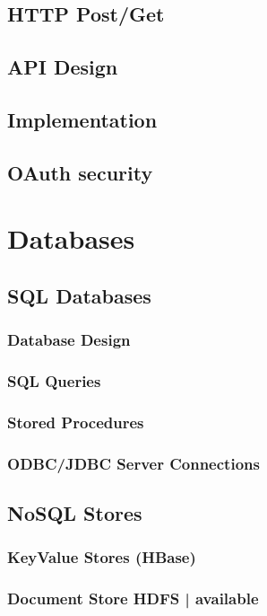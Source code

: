 \documentclass[12pt, numbers=noenddot]{scrreprt} %
\begin{document}
\section{HTTP Post/Get}
\section{API Design}
\section{Implementation}
\section{OAuth security}

\chapter{Databases}

\section{SQL Databases}

\subsection{Database Design}
\subsection{SQL Queries}
\subsection{Stored Procedures}
\subsection{ODBC/JDBC Server Connections}

\section{NoSQL Stores}
\subsection{KeyValue Stores (HBase)}
\subsection{Document Store HDFS | available}
\end{document}
